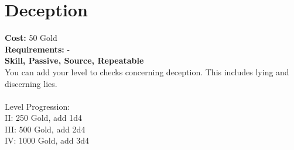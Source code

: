 \section{Deception}
\textbf{Cost:} 50 Gold\\
\textbf{Requirements:} -\\
\textbf{Skill, Passive, Source, Repeatable}\\
You can add your level to checks concerning deception. This includes lying and discerning lies.\\
\\
Level Progression:\\
II: 250 Gold, add 1d4\\
III: 500 Gold, add 2d4\\
IV: 1000 Gold, add 3d4\\